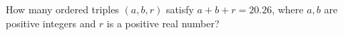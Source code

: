 How many ordered triples $(a,b,r)$ satisfy $a+b+r=20.26$, where $a,b$ are positive integers and $r$ is a positive real number?
